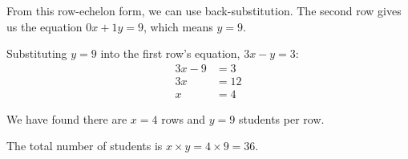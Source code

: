 \documentclass[journal]{IEEEtran}
\theoremstyle{remark}
\begin{document}
From this row-echelon form, we can use back-substitution. The second row gives us the equation $0x + 1y = 9$, which means $y=9$.

Substituting $y=9$ into the first row's equation, $3x - y = 3$:
\begin{align*}
    3x - 9 &= 3 \\
    3x &= 12 \\
    x &= 4
\end{align*}

We have found there are $x=4$ rows and $y=9$ students per row.

The total number of students is $x \times y = 4 \times 9 = 36$.
\end{document}
